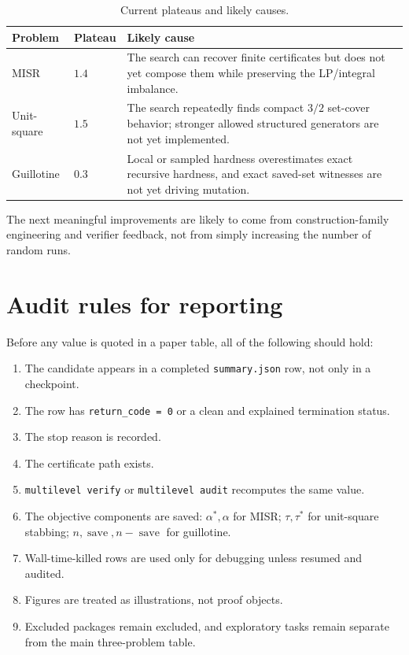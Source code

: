 \documentclass[11pt]{article}
\newcommand{\save}{\operatorname{save}}
\newcommand{\code}[1]{\texttt{#1}}
\begin{document}
\begin{table}[htbp]
\centering
\caption{Current plateaus and likely causes.}
\begin{tabularx}{\textwidth}{p{}p{}X}
\toprule
Problem & Plateau & Likely cause \\
\midrule
MISR & $1.4$ & The search can recover finite certificates but does not yet
compose them while preserving the LP/integral imbalance. \\
Unit-square & $1.5$ & The search repeatedly finds compact $3/2$ set-cover
behavior; stronger allowed structured generators are not yet implemented. \\
Guillotine & $0.3$ & Local or sampled hardness overestimates exact recursive
hardness, and exact saved-set witnesses are not yet driving mutation. \\
\bottomrule
\end{tabularx}
\end{table}

The next meaningful improvements are likely to come from construction-family
engineering and verifier feedback, not from simply increasing the number of
random runs.

\section{Audit rules for reporting}

Before any value is quoted in a paper table, all of the following should hold:
\begin{enumerate}
\item The candidate appears in a completed \code{summary.json} row, not only in
a checkpoint.
\item The row has \code{return\_code = 0} or a clean and explained termination
status.
\item The stop reason is recorded.
\item The certificate path exists.
\item \code{multilevel verify} or \code{multilevel audit} recomputes the same
value.
\item The objective components are saved: \(\alpha^*,\alpha\) for MISR;
\(\tau,\tau^*\) for unit-square stabbing; \(n,\save,n-\save\) for guillotine.
\item Wall-time-killed rows are used only for debugging unless resumed and
audited.
\item Figures are treated as illustrations, not proof objects.
\item Excluded packages remain excluded, and exploratory tasks remain separate
from the main three-problem table.
\end{enumerate}
\end{document}
